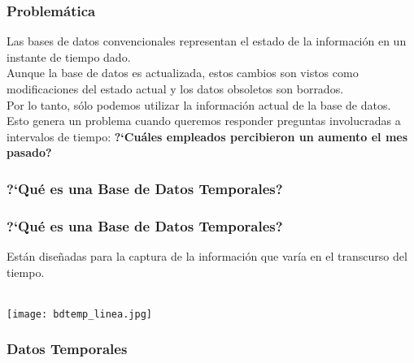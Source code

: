\documentclass[12pt]{beamer}
\begin{document}
\begin{frame}
\frametitle{Problem\'atica}
Las bases de datos convencionales representan el estado de la informaci\'on en un instante de tiempo dado.\\
Aunque la base de datos es actualizada, estos cambios son vistos como modificaciones del estado actual y los datos obsoletos son borrados.\\
Por lo tanto, s\'olo podemos utilizar la informaci\'on actual de la base de datos.\\
Esto genera un problema cuando queremos responder preguntas involucradas a intervalos de tiempo: \center \textbf{?`Cu\'ales empleados percibieron un aumento el mes pasado?}
\end{frame}

\begin{frame}
\frametitle{?`Qu\'e es una Base de Datos Temporales?}
\end{frame}

\begin{frame}
\frametitle{?`Qu\'e es una Base de Datos Temporales?}
Est\'an dise\~nadas para la captura de la informaci\'on que var\'ia en el transcurso del tiempo.\\
\ \\
\begin{center}\texttt{[image: bdtemp\_linea.jpg]}
\end{center}
\end{frame}

\begin{frame}
\frametitle{Datos Temporales}
\end{frame}
\end{document}
